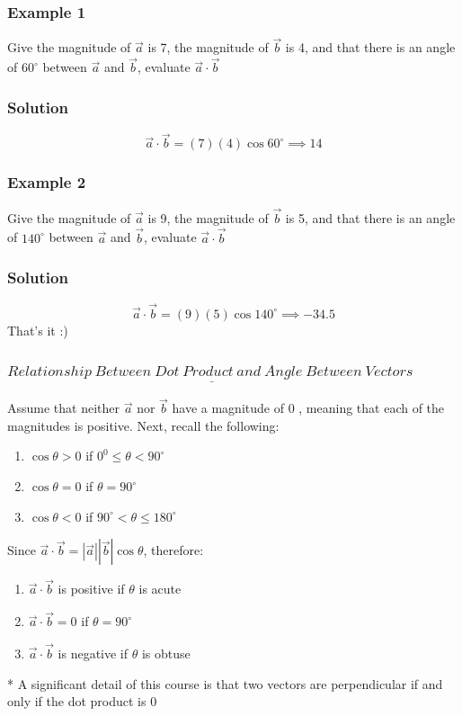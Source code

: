 \documentclass{article}
\begin{document}
\subsubsection*{Example 1}
Give the magnitude of $\vec{a}$ is 7, the magnitude of $\vec{b}$ is 4, and that there is an angle of $60^{\circ}$ between $\vec{a}$ and $\vec{b}$, evaluate $\vec{a}\cdot \vec{b}$

\subsubsection*{Solution}
$$\vec{a}\cdot \vec{b}=(7)(4)\cos 60^{\circ}\implies 14$$
\subsubsection*{Example 2}
Give the magnitude of $\vec{a}$ is 9, the magnitude of $\vec{b}$ is 5, and that there is an angle of $140^{\circ}$ between $\vec{a}$ and $\vec{b}$, evaluate $\vec{a}\cdot \vec{b}$

\subsubsection*{Solution}
$$\vec{a}\cdot \vec{b}=(9)(5)\cos 140^{\circ}\implies -34.5$$
That's it :)
\newpage 

\subsubsection{$\underline{R e l a t i o n s h i p ~ B e t w e e n ~ D o t ~ P r o d u c t ~ a n d ~ A n g l e ~ B e t w e e n ~ V e c t o r s ~}$}
Assume that neither $\vec{a}$ nor $\vec{b}$ have a magnitude of 0 , meaning that each of the magnitudes is positive.
Next, recall the following:\\
\begin{enumerate}
    \item $\cos \theta>0$ if $0^0 \leq \theta<90^{\circ}$
    \item $\cos \theta=0$ if $\theta=90^{\circ}$
    \item $\cos \theta<0$ if $90^{\circ}<\theta \leq 180^{\circ}$
\end{enumerate}


Since $\vec{a} \cdot \vec{b}=|\vec{a}||\vec{b}| \cos \theta$, therefore:\\
\begin{tcolorbox}[enhanced,frame style image=blueshade.png,
  opacityback=0.75,opacitybacktitle=0.25,
  colback=blue!5!white,colframe=blue!75!black] 
\begin{enumerate}
    \item $\vec{a} \cdot \vec{b}$ is positive if $\theta$ is acute
    \item $\vec{a} \cdot \vec{b}=0$ if $\theta=90^{\circ}$
    \item $\vec{a} \cdot \vec{b}$ is negative if $\theta$ is obtuse
\end{enumerate}

* A significant detail of this course is that two vectors are perpendicular if and only if the dot product is 0
\end{tcolorbox}
\end{document}
